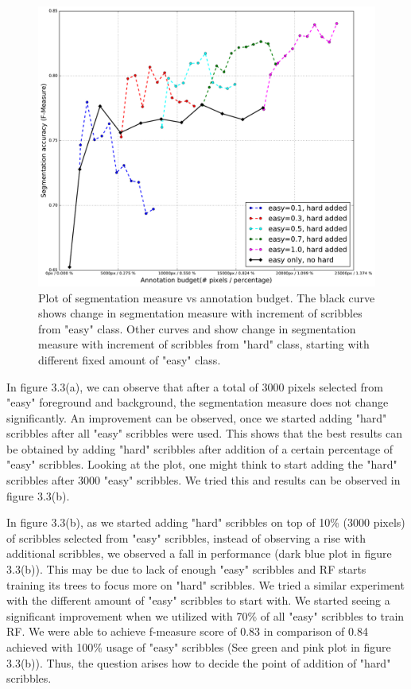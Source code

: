 \begin{figure}[h!] \label{fig:easy_hard1}
 \includegraphics[width=1.0\linewidth]{figures/rf_easy_hard.pdf}
\caption{Plot of segmentation measure vs annotation budget. The black curve shows change in segmentation measure with increment of scribbles from "easy" class. Other curves and show change in segmentation measure with increment of scribbles from "hard" class, starting with different fixed amount of "easy" class.}
\end{figure}


In figure 3.3(a), we can observe that after a total of 3000 pixels selected from "easy" foreground and background, the segmentation measure does not change significantly. An improvement can be observed, once we started adding "hard" scribbles after all "easy" scribbles were used. This shows that the best results can be obtained by adding "hard" scribbles after addition of a certain percentage of "easy" scribbles. Looking at the plot, one might think to start adding the "hard" scribbles after 3000 "easy" scribbles. We tried this and results can be observed in figure 3.3(b). \par

In figure 3.3(b), as we started adding "hard" scribbles on top of 10\% (3000 pixels) of scribbles selected from "easy" scribbles, instead of observing a rise with additional scribbles, we observed a fall in performance (dark blue plot in figure 3.3(b)). This may be due to lack of enough "easy" scribbles and RF starts training its trees to focus more on "hard" scribbles. We tried a similar experiment with the different amount of "easy" scribbles to start with. We started seeing a significant improvement when we utilized with 70\% of all "easy" scribbles to train RF. We were able to achieve f-measure score of 0.83 in comparison of 0.84 achieved with 100\% usage of "easy" scribbles (See green and pink plot in figure 3.3(b)). Thus, the question arises how to decide the point of addition of "hard" scribbles. 

